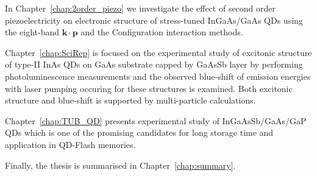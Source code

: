 \documentclass[
a4paper, %
11pt, %
onecolumn, %
openany, %
oldfontcommands,
]{memoir}
\begin{document}
In Chapter~\ref{chap:2order_piezo} we investigate the effect of second order piezoelectricity on electronic %
structure of stress-tuned InGaAs/GaAs QDs using the eight-band $\mathbf{k \cdot p}$ and the Configuration interaction methods.

Chapter~\ref{chap:SciRep} is focused on the experimental study of excitonic structure of type-II InAs QDs on GaAs substrate capped by GaAsSb layer by performing photoluminescence measurements and the observed blue-shift of emission energies with laser pumping occuring for these structures is examined. Both excitonic structure and blue-shift is supported by multi-particle calculations.

Chapter~\ref{chap:TUB_QD} presents experimental study of InGaAsSb/GaAs/GaP QDs which is one of the promising candidates for long storage time and application in QD-Flash memories.  

Finally, the thesis is summarised in Chapter~\ref{chap:summary}.
\newpage 




\mainmatter

%



\cleardoublepage


\cleardoublepage



\cleardoublepage
\appendix













\backmatter

\end{document}
